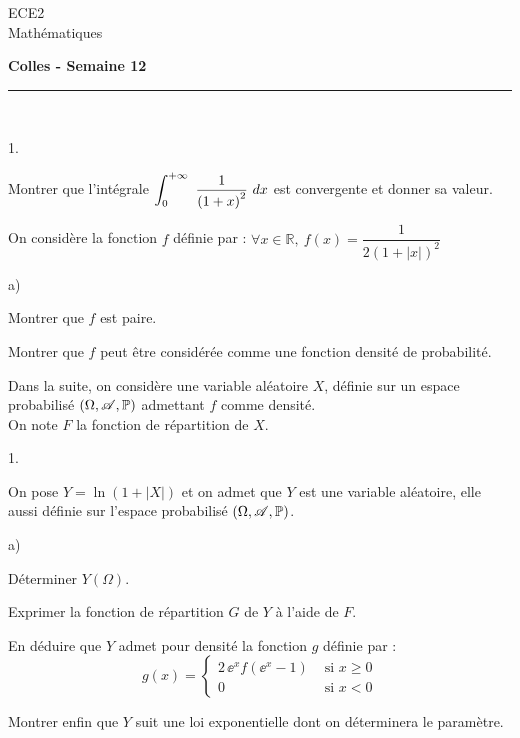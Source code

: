 \documentclass[11pt]{article}%
\begin{document}
\begin{flushleft}
ECE2 \\
Mathématiques
\end{flushleft}

\begin{center}
\textbf{\Large{Colles - Semaine 12}}
\end{center}

\hrule

\vspace*{0,2cm}

\begin{exercice}~
  \begin{noliste}{1.}
  \item Montrer que l'intégrale $ \displaystyle \int_{0}^{+\infty }\ \dfrac{1}{\left(
        1+x\right) ^{2}} \ dx$ est convergente et donner sa valeur.
  \item On considère la fonction $f$ définie par : $\forall x\in
    \mathbb{R},\ f\left( x\right) =\dfrac{1}{2\left( 1+\left \vert
          x\right \vert \right) ^{2}}$
    \begin{noliste}{a)}
    \item Montrer que $f$ est paire.
    \item Montrer que $f$ peut être considérée comme une fonction
      densité de probabilité.
    \end{noliste}
  \end{noliste}
  Dans la suite, on considère une variable aléatoire $X$, définie sur
  un espace probabilisé $\left( \Omega , \mathscr{A}, \mathbb{P} \right) $ 
admettant
  $f$ comme densité.\\
  On note $F$ la fonction de répartition de $X$.
  \begin{noliste}{1.}
    \addtocounter{enumi}{+2}
  \item On pose $Y=\ln \left( 1+\left \vert X\right \vert \right) $ et
    on admet que $Y$ est une variable aléatoire, elle aussi définie
    sur l'espace probabilisé $\left( \Omega , \mathscr{A}, \mathbb{P} \right)$.
    \begin{noliste}{a)}
    \item Déterminer $Y\left( \Omega \right) $.
    \item Exprimer la fonction de répartition $G$ de $Y$ à l'aide de
      $F.$
    \item En déduire que $Y$ admet pour densité la fonction $g$
      définie par : 
      \[ 
      g(x) = %
      \left\{
        \begin{array}{cl}
          2 \, \ee^{x}f\left( \ee^{x}-1\right) & \mbox{ si $x \geq 0$} 
	  \\
          0 & \mbox{ si $x<0$} %
        \end{array}
      \right.
      \]
    \item Montrer enfin que $Y$ suit une loi exponentielle dont on
      déterminera le paramètre.
    \end{noliste}
  \end{noliste}
\end{exercice}
\end{document}
